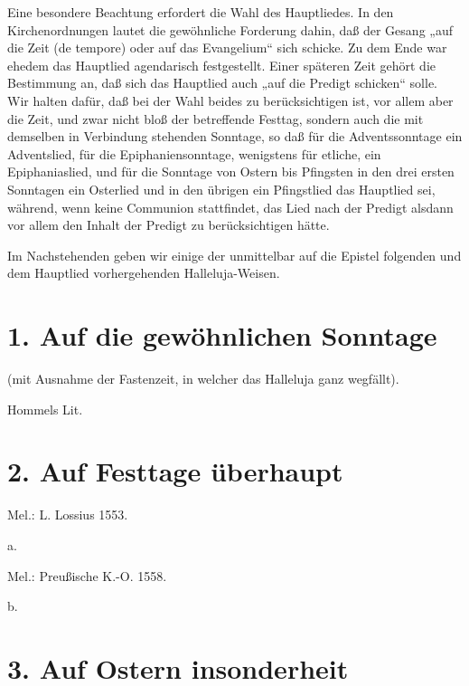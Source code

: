 Eine besondere Beachtung erfordert die Wahl des Hauptliedes. In den Kirchenordnungen lautet die gewöhnliche Forderung dahin, daß der Gesang „auf die Zeit (de tempore) oder auf das Evangelium“ sich schicke. Zu dem Ende war ehedem das Hauptlied agendarisch festgestellt. Einer späteren Zeit gehört die Bestimmung an, daß sich das Hauptlied auch „auf die Predigt schicken“ solle. Wir halten dafür, daß bei der Wahl beides zu berücksichtigen ist, vor allem aber die Zeit, und zwar nicht bloß der betreffende Festtag, sondern auch die mit demselben in Verbindung stehenden Sonntage, so daß für die Adventssonntage ein Adventslied, für die Epiphaniensonntage, wenigstens für etliche, ein Epiphaniaslied, und für die Sonntage von Ostern bis Pfingsten in den drei ersten Sonntagen ein Osterlied und in den übrigen ein Pfingstlied das Hauptlied sei, während, wenn keine Communion stattfindet, das Lied nach der Predigt alsdann vor allem den Inhalt der Predigt zu berücksichtigen hätte.

Im Nachstehenden geben wir einige der unmittelbar auf die Epistel folgenden und dem Hauptlied vorhergehenden Halleluja-Weisen.

\section{1. Auf die gewöhnlichen Sonntage}

(mit Ausnahme der Fastenzeit, in welcher das Halleluja ganz wegfällt).

Hommels Lit.


\section{2. Auf Festtage überhaupt}

Mel.: L. Lossius 1553.

a.


Mel.: Preußische K.-O. 1558.

b.


\section{3. Auf Ostern insonderheit}


